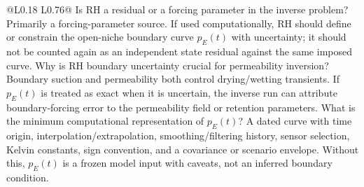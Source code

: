 \begin{longtable}{@{}L{0.18\textwidth} L{0.76\textwidth}@{}}
{ Is RH a residual or a forcing parameter in the inverse problem?}
{Primarily a forcing-parameter source.  If used computationally, RH should define or
constrain the open-niche boundary curve \(p_E(t)\) with uncertainty; it should not be
counted again as an independent state residual against the same imposed curve.}
{ Why is RH boundary uncertainty crucial for permeability inversion?}
{Boundary suction and permeability both control drying/wetting transients.  If
\(p_E(t)\) is treated as exact when it is uncertain, the inverse run can attribute
boundary-forcing error to the permeability field or retention parameters.}
{ What is the minimum computational representation of \(p_E(t)\)?}
{A dated curve with time origin, interpolation/extrapolation, smoothing/filtering
history, sensor selection, Kelvin constants, sign convention, and a covariance or
scenario envelope.  Without this, \(p_E(t)\) is a frozen model input with caveats, not
an inferred boundary condition.}
\bottomrule
\end{longtable}

